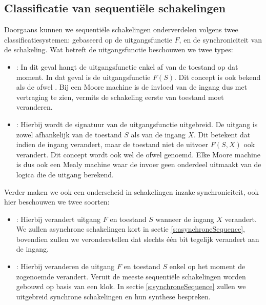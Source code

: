 \subsection{Classificatie van sequenti\"ele schakelingen}
\label{ss:classificationSequential}
Doorgaans kunnen we sequenti\"ele schakelingen onderverdelen volgens twee classificatiesystemen: gebaseerd op de uitgangsfunctie $F$, en de synchroniciteit van de schakeling. Wat betreft de uitgangsfunctie beschouwen we twee types:
\begin{itemize}
 \item {}: In dit geval hangt de uitgangsfunctie enkel af van de toestand op dat moment. In dat geval is de uitgangsfunctie $F\left(S\right)$. Dit concept is ook bekend als de  ofwel . Bij een Moore machine is de invloed van de ingang dus met vertraging te zien, vermits de schakeling eerste van toestand moet veranderen.
 \item {}: Hierbij wordt de signatuur van de uitgangsfunctie uitgebreid. De uitgang is zowel afhankelijk van de toestand $S$ als van de ingang $X$. Dit betekent dat indien de ingang verandert, maar de toestand niet de uitvoer $F\left(S,X\right)$ ook verandert. Dit concept wordt ook wel de  ofwel  genoemd. Elke Moore machine is dus ook een Mealy machine waar de invoer geen onderdeel uitmaakt van de logica die de uitgang berekend.
\end{itemize}
Verder maken we ook een onderscheid in schakelingen inzake synchroniciteit, ook hier beschouwen we twee soorten:
\begin{itemize}
 \item {}: Hierbij verandert uitgang $F$ en toestand $S$ wanneer de ingang $X$ verandert. We zullen asynchrone schakelingen kort in sectie \ref{s:asynchroneSequence}, bovendien zullen we veronderstellen dat slechts \'e\'en bit tegelijk verandert aan de ingang.
 \item {}: Hierbij veranderen de uitgang $F$ en toestand $S$ enkel op het moment de zogenoemde  verandert.
Veruit de meeste sequenti\"ele schakelingen worden gebouwd op basis van een klok. In sectie \ref{s:synchroneSequence} zullen we uitgebreid synchrone schakelingen en hun synthese bespreken.
\end{itemize}
